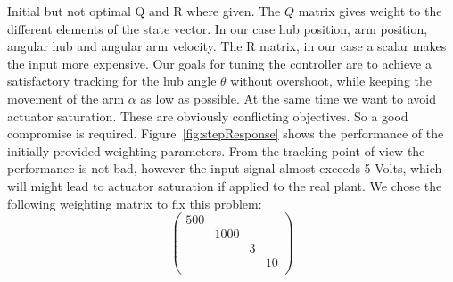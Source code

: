 \documentclass[ twoside,openright,titlepage,numbers=noenddot,headinclude,%
                footinclude=true,cleardoublepage=empty,abstractoff, %
                BCOR=5mm,paper=a4,fontsize=11pt,%
                ngerman,american,%
                ]{scrreprt}
\begin{document}
Initial but not optimal Q and R where given.  The $Q$ matrix gives weight to the different elements of the state vector. In our case hub position, arm position, angular hub and angular arm velocity. The R matrix, in our case a scalar makes the input more expensive. Our goals for tuning the controller are to achieve a satisfactory tracking for the hub angle $\theta$ without overshoot, while keeping the movement of the arm $\alpha$ as low as possible. At the same time we want to avoid actuator saturation. These are obviously conflicting objectives. So a good compromise is required. Figure~\ref{fig:stepResponse} shows the performance of the initially provided weighting parameters. From the tracking point of view the performance is not bad, however the input signal almost exceeds 5 Volts, which will might lead to actuator saturation if applied to the real plant. We chose the following weighting matrix to fix this problem:
\begin{equation}
\begin{pmatrix}
500 &		&	&	\\
	&1000	&	&	\\
	&	&3	&	\\
	&	&	&10	\\
\end{pmatrix}
\end{equation}
\end{document}
